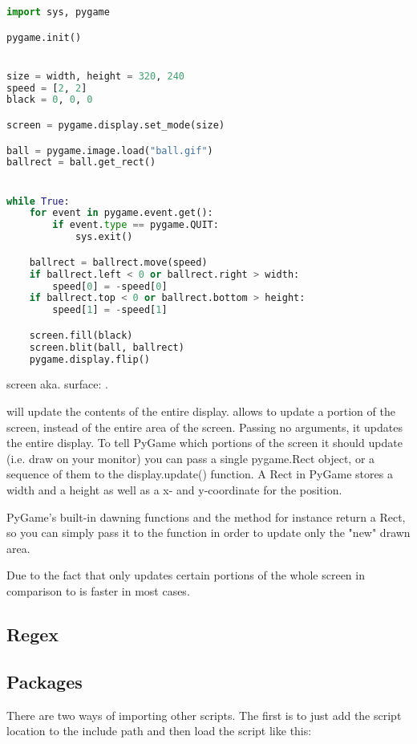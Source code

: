 \begin{lstlisting}[language=python]
import sys, pygame

pygame.init()


size = width, height = 320, 240
speed = [2, 2]
black = 0, 0, 0

screen = pygame.display.set_mode(size)

ball = pygame.image.load("ball.gif")
ballrect = ball.get_rect()


while True: 
    for event in pygame.event.get():
        if event.type == pygame.QUIT: 
            sys.exit()

    ballrect = ballrect.move(speed)
    if ballrect.left < 0 or ballrect.right > width:
        speed[0] = -speed[0]
    if ballrect.top < 0 or ballrect.bottom > height:
        speed[1] = -speed[1]

    screen.fill(black)
    screen.blit(ball, ballrect)
    pygame.display.flip()

\end{lstlisting}


screen aka. surface: .

 will update the contents of the entire display.  allows to update a portion of the screen, instead of the entire area of the screen. Passing no arguments, it updates the entire display. 
To tell PyGame which portions of the screen it should update (i.e. draw on your monitor) you can pass a single pygame.Rect object, or a sequence of them to the display.update() function. A Rect in PyGame stores a width and a height as well as a x- and y-coordinate for the position.

PyGame's built-in dawning functions and the  method for instance return a Rect, so you can simply pass it to the  function in order to update only the "new" drawn area.

Due to the fact that  only updates certain portions of the whole screen in comparison to  is faster in most cases.


\subsection{Regex}



\subsection{Packages}
There are two ways of importing other scripts. The first is to just add the script location to the include path and then load the script like this: 

